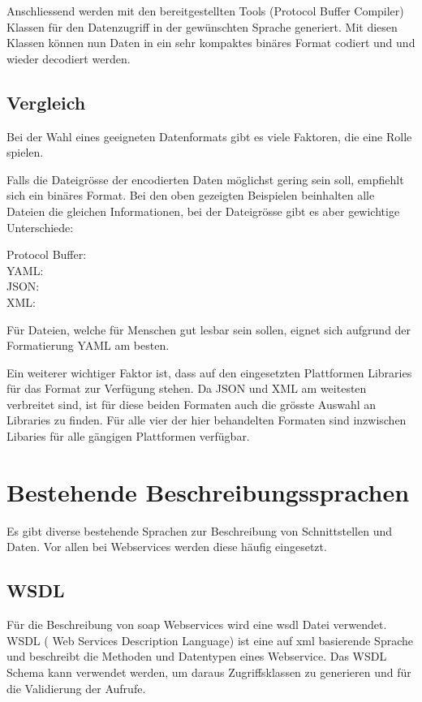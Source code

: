 Anschliessend werden mit den bereitgestellten Tools (Protocol Buffer Compiler) Klassen für den Datenzugriff in der gewünschten Sprache generiert. Mit diesen Klassen können nun Daten in ein sehr kompaktes binäres Format codiert und und wieder decodiert werden.

\subsection{Vergleich}

Bei der Wahl eines geeigneten Datenformats gibt es viele Faktoren, die eine Rolle spielen.

Falls die Dateigrösse der encodierten Daten möglichst gering sein soll, empfiehlt sich ein binäres Format. Bei den oben gezeigten Beispielen beinhalten alle Dateien die gleichen Informationen, bei der Dateigrösse gibt es aber gewichtige Unterschiede:

Protocol Buffer:   \\
YAML:              \\
JSON:              \\
XML:              

Für Dateien, welche für Menschen gut lesbar sein sollen, eignet sich aufgrund der Formatierung YAML am besten. 

Ein weiterer wichtiger Faktor ist, dass auf den eingesetzten Plattformen Libraries für das Format zur Verfügung stehen. Da JSON und XML am weitesten verbreitet sind, ist für diese beiden Formaten auch die grösste Auswahl an Libraries zu finden. Für alle vier der hier behandelten Formaten sind inzwischen Libaries für alle gängigen Plattformen verfügbar.


\section{Bestehende Beschreibungssprachen}

Es gibt diverse bestehende Sprachen zur Beschreibung von Schnittstellen und Daten. Vor allen bei Webservices werden diese häufig eingesetzt.

\subsection{WSDL}
Für die Beschreibung von \gls{soap} Webservices wird eine \gls{wsdl} Datei verwendet. WSDL ( Web Services Description Language) ist eine auf \gls{xml} basierende Sprache und beschreibt die Methoden und Datentypen eines Webservice. Das WSDL Schema kann verwendet werden, um daraus Zugriffsklassen zu generieren und für die Validierung der Aufrufe.

